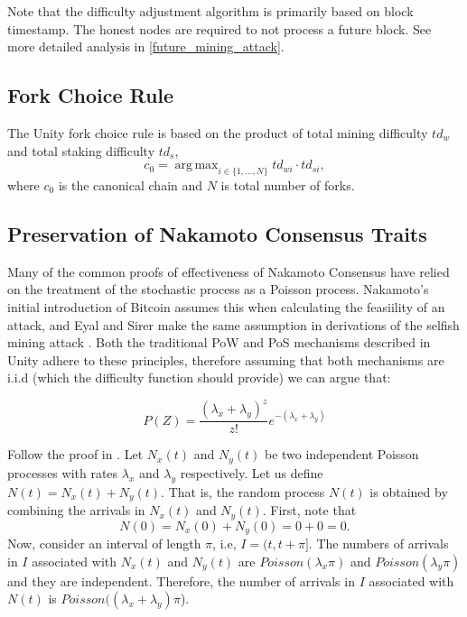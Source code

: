 \documentclass[a4paper]{article}
\DeclareMathOperator*{\argmax}{arg\,max}
\begin{document}
Note that the difficulty adjustment algorithm is primarily based on block timestamp. The honest nodes are required to not process a future block. See more detailed analysis in \cref{future_mining_attack}.

\subsection{Fork Choice Rule}
\label{sec:fork_choice_rule}

The Unity fork choice rule is based on the product of total mining difficulty $td_w$ and total staking difficulty $td_s$,
\begin{equation}
c_0 = \argmax_{i \in \{1,...,N\}}{td_{wi} \cdot td_{si}},
\end{equation}
where $c_0$ is the canonical chain and $N$ is total number of forks.

\subsection{Preservation of Nakamoto Consensus Traits}

Many of the common proofs of effectiveness of Nakamoto Consensus have relied on the treatment of the stochastic process as a Poisson process. Nakamoto's initial introduction of Bitcoin \cite{nakamoto2008} assumes this when calculating the feasiility of an attack, and Eyal and Sirer make the same assumption in derivations of the selfish mining attack \cite{eyal2018majority}. Both the traditional PoW and PoS mechanisms described in Unity adhere to these principles, therefore assuming that both mechanisms are i.i.d (which the difficulty function should provide) we can argue that:

\begin{equation}
    P(Z) = \frac{(\lambda_x + \lambda_y)^z}{z!}e^{-(\lambda_x+\lambda_y)}
\end{equation}

Follow the proof in \cite{pishro2016introduction}. Let $N_x(t)$ and $N_y(t)$ be two independent Poisson processes with rates $\lambda_x$ and $\lambda_y$ respectively. Let us define $N(t)=N_x(t)+N_y(t)$. That is, the random process $N(t)$ is obtained by combining the arrivals in $N_x(t)$ and $N_y(t)$. First, note that
\begin{equation}
    N(0)=N_x(0)+N_y(0)=0+0=0.
\end{equation}
Now, consider an interval of length $\pi$, i.e, $I=(t,t+\pi]$. The numbers of arrivals in $I$ associated with $N_x(t)$ and $N_y(t)$ are $Poisson(\lambda_x \pi)$ and $Poisson(\lambda_y \pi)$ and they are independent. Therefore, the number of arrivals in $I$ associated with $N(t)$ is $Poisson((\lambda_x+\lambda_y) \pi$).
\end{document}
